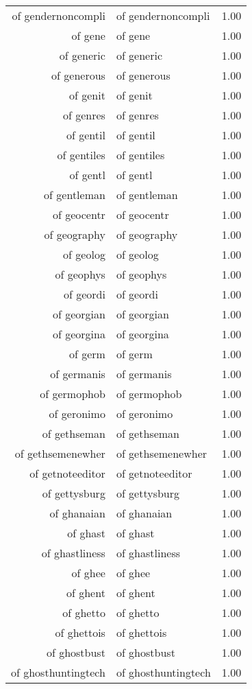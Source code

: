 \begin{table}[ht]
\begin{tabular}{rlr}
  of gendernoncompli & of gendernoncompli & 1.00 \\ 
  of gene & of gene & 1.00 \\ 
  of generic & of generic & 1.00 \\ 
  of generous & of generous & 1.00 \\ 
  of genit & of genit & 1.00 \\ 
  of genres & of genres & 1.00 \\ 
  of gentil & of gentil & 1.00 \\ 
  of gentiles & of gentiles & 1.00 \\ 
  of gentl & of gentl & 1.00 \\ 
  of gentleman & of gentleman & 1.00 \\ 
  of geocentr & of geocentr & 1.00 \\ 
  of geography & of geography & 1.00 \\ 
  of geolog & of geolog & 1.00 \\ 
  of geophys & of geophys & 1.00 \\ 
  of geordi & of geordi & 1.00 \\ 
  of georgian & of georgian & 1.00 \\ 
  of georgina & of georgina & 1.00 \\ 
  of germ & of germ & 1.00 \\ 
  of germanis & of germanis & 1.00 \\ 
  of germophob & of germophob & 1.00 \\ 
  of geronimo & of geronimo & 1.00 \\ 
  of gethseman & of gethseman & 1.00 \\ 
  of gethsemenewher & of gethsemenewher & 1.00 \\ 
  of getnoteeditor & of getnoteeditor & 1.00 \\ 
  of gettysburg & of gettysburg & 1.00 \\ 
  of ghanaian & of ghanaian & 1.00 \\ 
  of ghast & of ghast & 1.00 \\ 
  of ghastliness & of ghastliness & 1.00 \\ 
  of ghee & of ghee & 1.00 \\ 
  of ghent & of ghent & 1.00 \\ 
  of ghetto & of ghetto & 1.00 \\ 
  of ghettois & of ghettois & 1.00 \\ 
  of ghostbust & of ghostbust & 1.00 \\ 
  of ghosthuntingtech & of ghosthuntingtech & 1.00 \\ 

\end{tabular}
\end{table}
